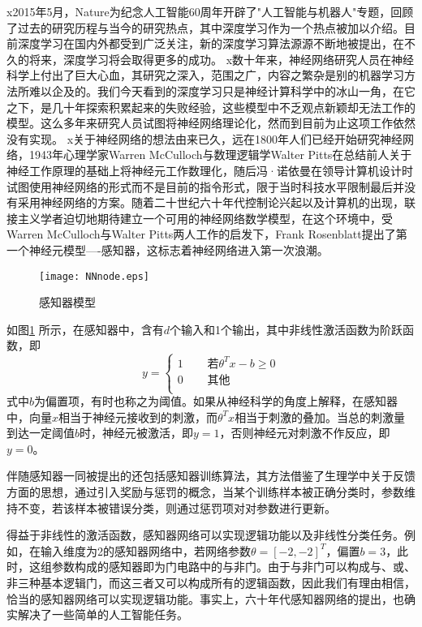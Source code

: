 x2015年5月，Nature为纪念人工智能60周年开辟了"人工智能与机器人"专题，回顾了过去的研究历程与当今的研究热点，其中深度学习作为一个热点被加以介绍。目前深度学习在国内外都受到广泛关注，新的深度学习算法源源不断地被提出，在不久的将来，深度学习将会取得更多的成功。
x数十年来，神经网络研究人员在神经科学上付出了巨大心血，其研究之深入，范围之广，内容之繁杂是别的机器学习方法所难以企及的。我们今天看到的深度学习只是神经计算科学中的冰山一角，在它之下，是几十年探索积累起来的失败经验，这些模型中不乏观点新颖却无法工作的模型。这么多年来研究人员试图将神经网络理论化，然而到目前为止这项工作依然没有实现。
x关于神经网络的想法由来已久，远在1800年人们已经开始研究神经网络，1943年心理学家Warren McCulloch与数理逻辑学Walter Pitts在总结前人关于神经工作原理的基础上将神经元工作数理化，随后冯·诺依曼在领导计算机设计时试图使用神经网络的形式而不是目前的指令形式，限于当时科技水平限制最后并没有采用神经网络的方案。随着二十世纪六十年代控制论兴起以及计算机的出现，联接主义学者迫切地期待建立一个可用的神经网络数学模型，在这个环境中，受Warren McCulloch与Walter Pitts两人工作的启发下，Frank Rosenblatt提出了第一个神经元模型----感知器，这标志着神经网络进入第一次浪潮。
\begin{figure}[!htbp]
\centering
\texttt{[image: NNnode.eps]}
\caption{感知器模型}
\label{img:NNnode}
\end{figure}

如图\ref{img:NNnode} 所示，在感知器中，含有$d$个输入和1个输出，其中非线性激活函数为阶跃函数，即
\begin{equation}
y = \left\{
\begin{array}{cc}
1 & \text{~~~~若$\theta^Tx - b \geq 0$}\\
0 & \text{~~~~其他}\\
\end{array}
\right.
\end{equation}
式中$b$为偏置项，有时也称之为阈值。如果从神经科学的角度上解释，在感知器中，向量$x$相当于神经元接收到的刺激，而$\theta^T x$相当于刺激的叠加。当总的刺激量到达一定阈值$b$时，神经元被激活，即$y=1$，否则神经元对刺激不作反应，即$y=0$。

伴随感知器一同被提出的还包括感知器训练算法，其方法借鉴了生理学中关于反馈方面的思想，通过引入奖励与惩罚的概念，当某个训练样本被正确分类时，参数维持不变，若该样本被错误分类，则通过惩罚项对对参数进行更新。

得益于非线性的激活函数，感知器网络可以实现逻辑功能以及非线性分类任务。例如，在输入维度为2的感知器网络中，若网络参数$\theta = [-2, -2]^T$，偏置$b = 3$，此时，这组参数构成的感知器即为门电路中的与非门。由于与非门可以构成与、或、非三种基本逻辑门，而这三者又可以构成所有的逻辑函数，因此我们有理由相信，恰当的感知器网络可以实现逻辑功能。事实上，六十年代感知器网络的提出，也确实解决了一些简单的人工智能任务。

